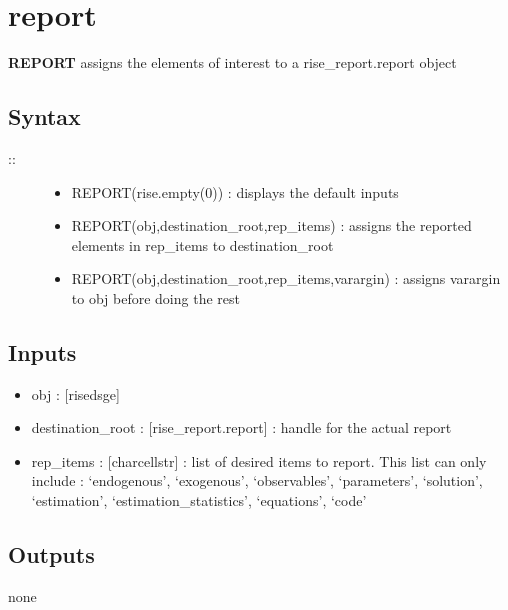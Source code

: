 \documentclass[letterpaper,10pt,english]{sphinxmanual}
\begin{document}
\section{report}
\label{classes/models/@svar/svar:report}\label{classes/models/@svar/svar:id97}
\textbf{REPORT} assigns the elements of interest to a rise\_report.report object


\subsection{Syntax}
\label{classes/models/@svar/svar:id98}\begin{description}
\item[{::}] \leavevmode\begin{itemize}
\item {} 
REPORT(rise.empty(0)) : displays the default inputs

\item {} 
REPORT(obj,destination\_root,rep\_items) : assigns the reported
elements in rep\_items to destination\_root

\item {} 
REPORT(obj,destination\_root,rep\_items,varargin) : assigns varargin to
obj before doing the rest

\end{itemize}

\end{description}


\subsection{Inputs}
\label{classes/models/@svar/svar:id99}\begin{itemize}
\item {} 
obj : {[}rise\textbar{}dsge{]}

\item {} 
destination\_root : {[}rise\_report.report{]} : handle for the actual report

\item {} 
rep\_items : {[}char\textbar{}cellstr{]} : list of desired items to report. This list
can only include : `endogenous', `exogenous', `observables',
`parameters', `solution', `estimation', `estimation\_statistics',
`equations', `code'

\end{itemize}


\subsection{Outputs}
\label{classes/models/@svar/svar:id100}
none
\end{document}
